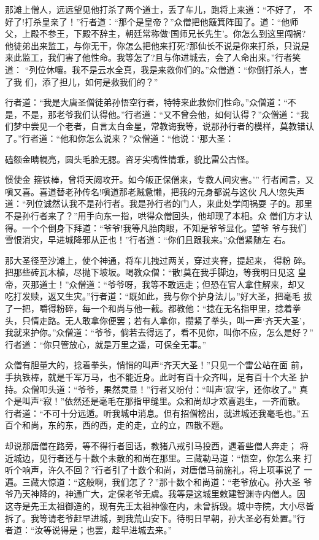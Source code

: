 那滩上僧人，远远望见他打杀了两个道士，丢了车儿，跑将上来道：“不好了，
不好了!打杀皇亲了！”行者道：“那个是皇帝？”众僧把他簸箕阵围了。道：“他师
父，上殿不参王，下殿不辞主，朝廷常称做‘国师兄长先生’。你怎么到这里闯祸?
他徒弟出来监工，与你无干，你怎么把他来打死?那仙长不说是你来打杀，只说是
来此监工，我们害了他性命。我等怎了?且与你进城去，会了人命出来。”行者笑道：
“列位休嚷。我不是云水全真，我是来救你们的。”众僧道：“你倒打杀人，害了我
们，添了担儿，如何是救我们的？”

行者道：“我是大唐圣僧徒弟孙悟空行者，特特来此救你们性命。”众僧道：“不
是，不是，那老爷我们认得他。”行者道：“又不曾会他，如何认得？”众僧道：“我
们梦中尝见一个老者，自言太白金星，常教诲我等，说那孙行者的模样，莫教错认
了。”行者道：“他和你怎么说来？”众僧道：“他说：‘那大圣：

磕额金睛幌亮，圆头毛脸无腮。咨牙尖嘴性情乖，貌比雷公古怪。

惯使金
箍铁棒，曾将天阙攻开。如今皈正保僧来，专救人间灾害。’”
行者闻言，又嗔又喜。喜道替老孙传名!嗔道那老贼惫懒，把我的元身都说与这伙
凡人!忽失声道：“列位诚然认我不是孙行者。我是孙行者的门人，来此处学闯祸耍
子的。那里不是孙行者来了？”用手向东一指，哄得众僧回头，他却现了本相。众
僧们方才认得。一个个倒身下拜道：“爷爷!我等凡胎肉眼，不知是爷爷显化。望爷
爷与我们雪恨消灾，早进城降邪从正也！”行者道：“你们且跟我来。”众僧紧随左
右。

那大圣径至沙滩上，使个神通，将车儿拽过两关，穿过夹脊，提起来，得粉
碎。把那些砖瓦木植，尽抛下坡坂。喝教众僧：“散!莫在我手脚边，等我明日见这
皇帝，灭那道士！”众僧道：“爷爷呀，我等不敢远走；但恐在官人拿住解来，却又
吃打发赎，返又生灾。”行者道：“既如此，我与你个护身法儿。”好大圣，把毫毛
拔了一把，嚼得粉碎，每一个和尚与他一截。都教他：“捻在无名指甲里，捻着拳
头，只情走路。无人敢拿你便罢；若有人拿你，攒紧了拳头，叫一声‘齐天大圣’，
我就来护你。”众僧道：“爷爷，倘若去得远了，看不见你，叫你不应，怎么是好？”
行者道：“你只管放心，就是万里之遥，可保全无事。”

众僧有胆量大的，捻着拳头，悄悄的叫声“齐天大圣！”只见一个雷公站在面
前，手执铁棒，就是千军万马，也不能近身。此时有百十众齐叫，足有百十个大圣
护持。众僧叩头道：“爷爷，果然灵显！”行者又吩付：“叫声‘寂’字，还你收了。”
真个是叫声“寂！”依然还是毫毛在那指甲缝里。众和尚却才欢喜逃生，一齐而散。
行者道：“不可十分远遁。听我城中消息。但有招僧榜出，就进城还我毫毛也。”五
百个和尚，东的东，西的西，走的走，立的立，四散不题。

却说那唐僧在路旁，等不得行者回话，教猪八戒引马投西，遇着些僧人奔走；
将近城边，见行者还与十数个未散的和尚在那里。三藏勒马道：“悟空，你怎么来
打听个响声，许久不回？”行者引了十数个和尚，对唐僧马前施礼，将上项事说了
一遍。三藏大惊道：“这般啊，我们怎了？”那十数个和尚道：“老爷放心。孙大圣
爷爷乃天神降的，神通广大，定保老爷无虞。我等是这城里敕建智渊寺内僧人。因
这寺是先王太祖御造的，现有先王太祖神像在内，未曾拆毁。城中寺院，大小尽皆
拆了。我等请老爷赶早进城，到我荒山安下。待明日早朝，孙大圣必有处置。”行
者道：“汝等说得是；也罢，趁早进城去来。”

